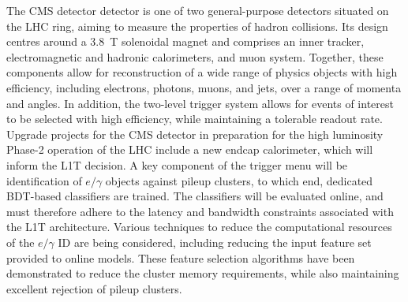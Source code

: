 The CMS detector detector is one of two general-purpose detectors situated on the LHC ring, aiming to measure the properties of hadron collisions. Its design centres around a 3.8~T solenoidal magnet and comprises an inner tracker, electromagnetic and hadronic calorimeters, and muon system. Together, these components allow for reconstruction of a wide range of physics objects with high efficiency, including electrons, photons, muons, and jets, over a range of momenta and angles. In addition, the two-level trigger system allows for events of interest to be selected with high efficiency, while maintaining a tolerable readout rate. Upgrade projects for the CMS detector in preparation for the high luminosity Phase-2 operation of the LHC include a new endcap calorimeter, which will inform the L1T decision. A key component of the trigger menu will be identification of $e/\gamma$ objects against pileup clusters, to which end, dedicated BDT-based classifiers are trained. The classifiers will be evaluated online, and must therefore adhere to the latency and bandwidth constraints associated with the L1T architecture. Various techniques to reduce the computational resources of the $e/\gamma$ ID are being considered, including reducing the input feature set provided to online models. These feature selection algorithms have been demonstrated to reduce the cluster memory requirements, while also maintaining excellent rejection of pileup clusters.
    
